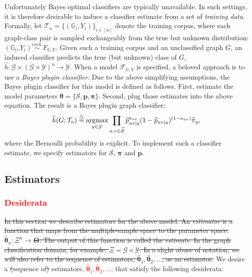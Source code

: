 \documentclass[10pt,journal,cspaper,compsoc]{IEEEtran}
\providecommand{\tr}[1]{\textcolor{red}{#1}}
\providecommand{\ve}[1]{\boldsymbol{#1}}
\newcommand{\argmax}{\operatornamewithlimits{argmax}}
\newcommand{\GG}{\mathbb{G}}
\newcommand{\bth}{\ve{\theta}}
\newcommand{\bhth}{\wh{\ve{\theta}}}
\newcommand{\bTh}{\ve{\Theta}}
\providecommand{\mc}[1]{\mathcal{#1}}
\providecommand{\mb}[1]{\boldsymbol{#1}}
\providecommand{\wh}[1]{\widehat{#1}}
\providecommand{\mhc}[1]{\widehat{\mathcal{#1}}}
\newcommand{\defeq}{\overset{\triangle}{=}}
\newcommand{\from}{{\ensuremath{\colon}}}           %
\begin{document}
Unfortunately Bayes optimal classifiers are typically unavailable. In such settings, it is therefore desirable to induce a classifier estimate from a set of \emph{training data}. Formally, let $\mc{T}_n= \{(\GG_i,Y_i)\}_{i \in [n]}$ denote the training corpus, where each graph-class pair is sampled exchangeably from the true but unknown distribution: $(\GG_i,Y_i) \overset{exch.}{\sim} F_{\GG, Y}$.  Given such a training corpus and an unclassified graph $G$, an induced classifier predicts the true (but unknown) class of $G$, $\wh{h}\from \mc{G} \times (\mc{G} \times \mc{Y})^n  \to \mc{Y}$.  When a model $\mc{F}_{\GG,Y}$ is specified, a beloved approach is to use a  \emph{Bayes plugin classifier}. Due to the above simplifying assumptions, the Bayes plugin classifier for this model is defined as follows.  First, estimate the  model parameters $\bth=\{\mc{S}, \mb{p}, \mb{\pi}\}$. Second, plug those estimates into the above equation.  The result is a Bayes plugin graph classifier:
\begin{align}
\wh{h}(G; \mc{T}_n) \defeq  \argmax_{y \in \mc{Y}} \prod_{u,v \in \mhc{S}}
\wh{p}_{uv|y}^{a_{uv}}(1-\wh{p}_{uv|y})^{(1-a_{uv})} \wh{\pi}_y,
\end{align}
where the Bernoulli probability is explicit. To implement such a classifier estimate, we specify estimators for $\mc{S}$, $\mb{\pi}$ and $\mb{p}$.


\subsection{Estimators} %
\label{sub:estimators}


\tr{\subsubsection{Desiderata}}

\sout{In this section we describe estimators for the above model.  An \emph{estimator} is a function that maps from the multiple-sample space to the parameter space: $\bhth_n: \Xi^n \to \bTh$. The output of this function is called the \emph{estimate}.  In the graph classification domain, for example, $\Xi=\mc{G} \times \mc{Y}$.  In a slight abuse of notation, we will also refer to the sequence of estimators, $\bhth_1,\bhth_2, \ldots$, as an estimator.}  We desire a \sout{(}sequence of\sout{)} estimators\tr{, $\bhth_1,\bhth_2, \ldots$,} that satisfy the following desiderata:
\end{document}
